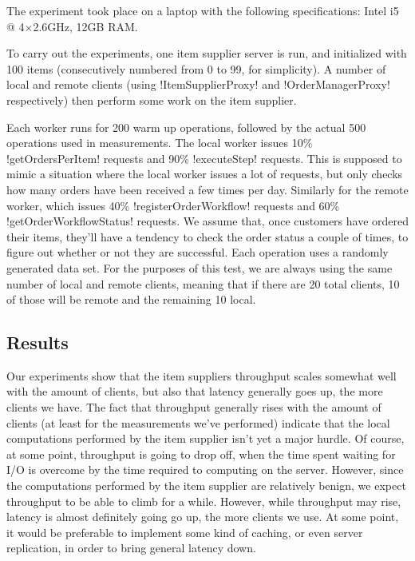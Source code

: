 \documentclass[a4paper, 12pt]{article}
\begin{document}
The experiment took place on a laptop with the following
specifications: Intel i5 @ 4$\times$2.6GHz, 12GB RAM.

To carry out the experiments, one item supplier server is run, and
initialized with 100 items (consecutively numbered from 0 to 99, for
simplicity). A number of local and remote clients (using
!ItemSupplierProxy! and !OrderManagerProxy! respectively) then perform
some work on the item supplier.

Each worker runs for 200 warm up operations, followed by the actual
500 operations used in measurements. The local worker issues 10\%
!getOrdersPerItem! requests and 90\% !executeStep! requests. This is
supposed to mimic a situation where the local worker issues a lot of
requests, but only checks how many orders have been received a few
times per day. Similarly for the remote worker, which issues 40\%
!registerOrderWorkflow! requests and 60\% !getOrderWorkflowStatus!
requests. We assume that, once customers have ordered their items,
they'll have a tendency to check the order status a couple of times,
to figure out whether or not they are successful. Each operation uses
a randomly generated data set. For the purposes of this test, we are
always using the same number of local and remote clients, meaning that
if there are 20 total clients, 10 of those will be remote and the
remaining 10 local.

\subsection*{Results}

Our experiments show that the item suppliers throughput scales
somewhat well with the amount of clients, but also that latency
generally goes up, the more clients we have. The fact that throughput
generally rises with the amount of clients (at least for the
measurements we've performed) indicate that the local computations
performed by the item supplier isn't yet a major hurdle. Of course, at
some point, throughput is going to drop off, when the time spent
waiting for I/O is overcome by the time required to computing on the
server. However, since the computations performed by the item supplier
are relatively benign, we expect throughput to be able to climb for a
while. However, while throughput may rise, latency is almost
definitely going go up, the more clients we use. At some point, it
would be preferable to implement some kind of caching, or even
server replication, in order to bring general latency down.
\end{document}
